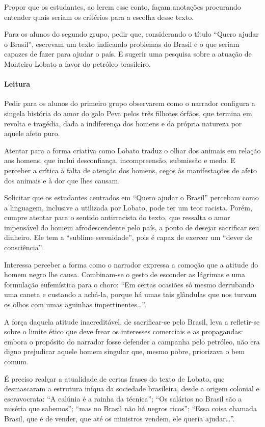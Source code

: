 \documentclass[11pt]{extarticle}
\begin{document}
Propor que os estudantes, ao lerem esse conto, façam anotações
procurando entender quais seriam os critérios para a escolha desse
texto.

Para os alunos do segundo grupo, pedir que, considerando o título
``Quero ajudar o Brasil'', escrevam um texto indicando problemas do
Brasil e o que seriam capazes de fazer para ajudar o país. E sugerir uma
pesquisa sobre a atuação de Monteiro Lobato a favor do petróleo
brasileiro.

\asterisc\paragraph{Leitura}

Pedir para os alunos do primeiro grupo observarem como o narrador
configura a singela história do amor do galo Peva pelos três filhotes
órfãos, que termina em revolta e tragédia, dada a indiferença dos homens
e da própria natureza por aquele afeto puro.

Atentar para a forma criativa como Lobato traduz o olhar dos animais em
relação aos homens, que inclui desconfiança, incompreensão, submissão e
medo. E perceber a crítica à falta de atenção dos homens, cegos às
manifestações de afeto dos animais e à dor que lhes causam.

Solicitar que os estudantes centrados em ``Quero ajudar o Brasil''
percebam como a linguagem, inclusive a utilizada por Lobato, pode ter um
teor racista. Porém, cumpre atentar para o sentido antirracista do
texto, que ressalta o amor impensável do homem afrodescendente pelo
país, a ponto de desejar sacrificar seu dinheiro. Ele tem a ``sublime
serenidade'', pois é capaz de exercer um ``dever de consciência''.

Interessa perceber a forma como o narrador expressa a comoção que a
atitude do homem negro lhe causa. Combinam-se o gesto de esconder as
lágrimas e uma formulação eufemística para o choro: ``Em certas ocasiões
só mesmo derrubando uma caneta e custando a achá-la, porque há umas tais
glândulas que nos turvam os olhos com umas aguinhas
impertinentes\ldots{}''.

A força daquela atitude inacreditável, de sacrificar-se pelo Brasil,
leva a refletir-se sobre o limite ético que deve frear os interesses
comerciais e as propagandas: embora o propósito do narrador fosse
defender a campanha pelo petróleo, não era digno prejudicar aquele homem
singular que, mesmo pobre, priorizava o bem comum.

É preciso realçar a atualidade de certas frases do texto de Lobato, que
desmascaram a estrutura iníqua da sociedade brasileira, desde a origem
colonial e escravocrata: ``A calúnia é a rainha da técnica''; ``Os
salários no Brasil são a miséria que sabemos''; ``mas no Brasil não há
negros ricos''; ``Essa coisa chamada Brasil, que é de vender, que até os
ministros vendem, ele queria ajudar\ldots{}''.
\end{document}
